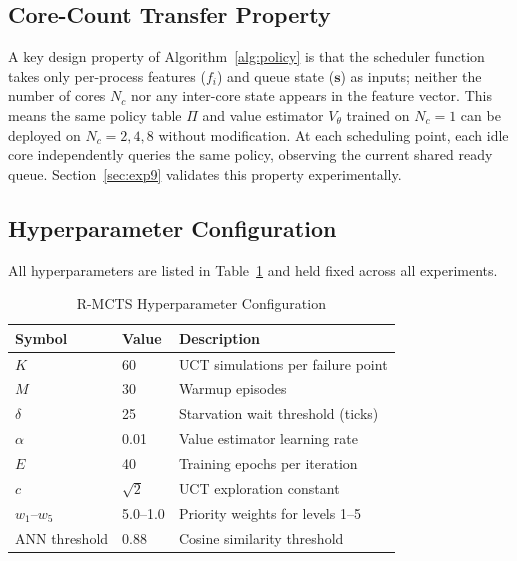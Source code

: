 \documentclass[10pt,journal,compsoc]{IEEEtran}
\begin{document}
\subsection{Core-Count Transfer Property}

A key design property of Algorithm~\ref{alg:policy} is that the
scheduler function takes only per-process features ($f_i$) and queue
state ($\mathbf{s}$) as inputs; neither the number of cores $N_c$ nor
any inter-core state appears in the feature vector.
This means the same policy table $\Pi$ and value estimator $V_\theta$
trained on $N_c{=}1$ can be deployed on $N_c{=}2,4,8$ without
modification.
At each scheduling point, each idle core independently queries the same
policy, observing the current shared ready queue.
Section~\ref{sec:exp9} validates this property experimentally.

\subsection{Hyperparameter Configuration}

All hyperparameters are listed in Table~\ref{tab:hyperparams} and held
fixed across all experiments.

\begin{table}[!t]
\centering
\caption{R-MCTS Hyperparameter Configuration}
\label{tab:hyperparams}
\renewcommand{\arraystretch}{1.1}
\begin{tabular}{@{}l l p{3.8cm}@{}}
\toprule
\textbf{Symbol} & \textbf{Value} & \textbf{Description} \\
\midrule
$K$           & 60         & UCT simulations per failure point \\
$M$           & 30         & Warmup episodes \\
$\delta$      & 25         & Starvation wait threshold (ticks) \\
$\alpha$      & 0.01       & Value estimator learning rate \\
$E$           & 40         & Training epochs per iteration \\
$c$           & $\sqrt{2}$ & UCT exploration constant \\
$w_1$--$w_5$ & 5.0--1.0   & Priority weights for levels 1--5 \\
ANN threshold & 0.88       & Cosine similarity threshold \\
\bottomrule
\end{tabular}
\end{table}

\end{document}

